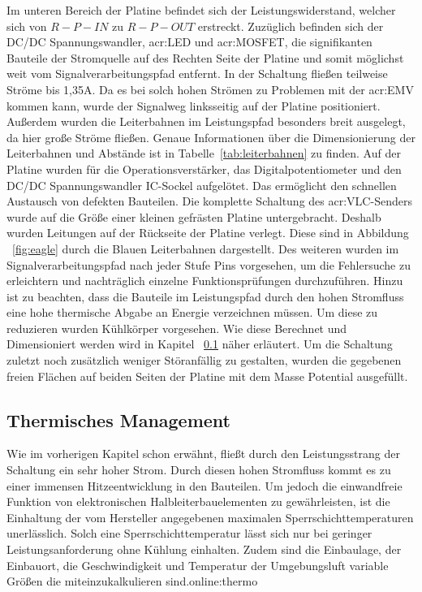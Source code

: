 Im unteren Bereich der Platine befindet sich der Leistungswiderstand, welcher sich von $R-P-IN$ zu $R-P-OUT$ erstreckt. Zuzüglich befinden sich der DC/DC Spannungswandler, \gls{acr:LED} und \gls{acr:MOSFET}, die signifikanten Bauteile der Stromquelle auf des Rechten Seite der Platine und somit möglichst weit vom Signalverarbeitungspfad entfernt. In der Schaltung fließen teilweise Ströme bis 1,35A. Da es bei solch hohen Strömen zu Problemen mit der   \gls{acr:EMV} kommen kann, wurde der Signalweg linksseitig auf der Platine positioniert. Außerdem wurden die Leiterbahnen im Leistungspfad besonders breit ausgelegt, da hier große Ströme fließen. Genaue Informationen über die Dimensionierung der Leiterbahnen und Abstände ist in Tabelle~\ref{tab:leiterbahnen} zu finden. Auf der Platine wurden für die Operationsverstärker, das Digitalpotentiometer und den DC/DC Spannungswandler IC-Sockel aufgelötet. Das ermöglicht den schnellen Austausch von defekten Bauteilen. Die komplette Schaltung des \gls{acr:VLC}-Senders wurde auf die Größe einer kleinen gefrästen Platine untergebracht. Deshalb wurden Leitungen auf der Rückseite der Platine verlegt. Diese sind in Abbildung ~\ref{fig:eagle} durch die Blauen Leiterbahnen dargestellt. Des weiteren wurden im Signalverarbeitungspfad nach jeder Stufe Pins vorgesehen, um die Fehlersuche zu erleichtern und nachträglich einzelne Funktionsprüfungen durchzuführen. Hinzu ist zu beachten, dass die Bauteile im Leistungspfad durch den hohen Stromfluss eine hohe thermische Abgabe an Energie verzeichnen müssen. Um diese zu reduzieren wurden Kühlkörper vorgesehen. Wie diese Berechnet und Dimensioniert werden wird in Kapitel ~\ref{subsub:thermo} näher erläutert. Um die Schaltung zuletzt noch zusätzlich weniger Störanfällig zu gestalten, wurden die gegebenen freien Flächen auf beiden Seiten der Platine mit dem Masse Potential ausgefüllt. 

\subsection{Thermisches Management}
\label{subsub:thermo}
Wie im vorherigen Kapitel schon erwähnt, fließt durch den Leistungsstrang der Schaltung ein sehr hoher Strom. Durch diesen hohen Stromfluss kommt es zu einer immensen Hitzeentwicklung in den Bauteilen. Um jedoch die einwandfreie Funktion von elektronischen Halbleiterbauelementen zu gewährleisten, ist die Einhaltung der vom Hersteller angegebenen maximalen Sperrschichttemperaturen unerlässlich. Solch eine Sperrschichttemperatur lässt sich nur bei geringer Leistungsanforderung ohne Kühlung einhalten. Zudem sind die Einbaulage, der Einbauort, die Geschwindigkeit und Temperatur der Umgebungsluft variable Größen die miteinzukalkulieren sind.\gls{online:thermo}

